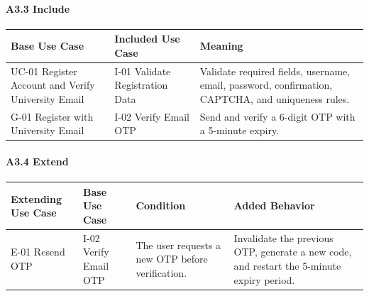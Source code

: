 \documentclass[12pt]{article}
\renewcommand{\baselinestretch}{1.5}
\begin{document}
\hypertarget{sec:a3-3-include}{}
\paragraph*{A3.3 Include}
\par\medskip

\begingroup
\small
\renewcommand{\baselinestretch}{1.0}\selectfont
\renewcommand{\arraystretch}{1.15}
\setlength{\tabcolsep}{6pt}
\begin{longtable}{|>{\raggedright\arraybackslash}p{}|>{\raggedright\arraybackslash}p{}|>{\raggedright\arraybackslash}p{}|}
\hline
\textbf{Base Use Case} & \textbf{Included Use Case} & \textbf{Meaning} \\ \hline
\endhead
UC-01 Register Account and Verify University Email & I-01 Validate Registration Data & Validate required fields, username, email, password, confirmation, CAPTCHA, and uniqueness rules. \\ \hline
G-01 Register with University Email & I-02 Verify Email OTP & Send and verify a 6-digit OTP with a 5-minute expiry. \\ \hline
\end{longtable}
\endgroup
\par\medskip

\hypertarget{sec:a3-4-extend}{}
\paragraph*{A3.4 Extend}
\par\medskip

\begingroup
\small
\renewcommand{\baselinestretch}{1.0}\selectfont
\renewcommand{\arraystretch}{1.15}
\setlength{\tabcolsep}{6pt}
\begin{longtable}{|>{\raggedright\arraybackslash}p{}|>{\raggedright\arraybackslash}p{}|>{\raggedright\arraybackslash}p{}|>{\raggedright\arraybackslash}p{}|}
\hline
\textbf{Extending Use Case} & \textbf{Base Use Case} & \textbf{Condition} & \textbf{Added Behavior} \\ \hline
\endhead
E-01 Resend OTP & I-02 Verify Email OTP & The user requests a new OTP before verification. & Invalidate the previous OTP, generate a new code, and restart the 5-minute expiry period. \\ \hline
\end{longtable}
\endgroup
\par\medskip

\hypertarget{sec:a4-model-notes}{}
\end{document}
